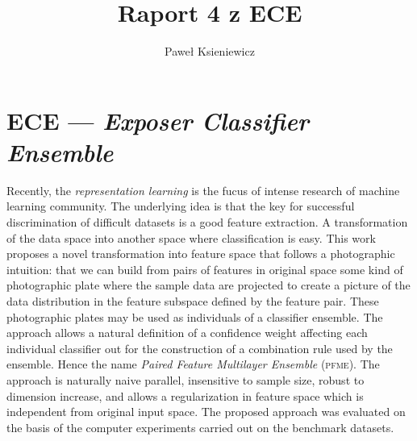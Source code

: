 \documentclass[]{article}
\title{Raport 4 z ECE}
\author{Paweł Ksieniewicz}
\begin{document}
\newenvironment{ride}[2]
{
	\caption{#2}
    \label{tab:results}
	\centering
	\begin{tabular}{lS>{\color{red}}S}
		\\\toprule{promień} & {accuracy} & {\textsc{bac}} \\\midrule
	    \csvreader[head to column names]{#1}{}%
	    {\radius & \accuracy & \bac\\}%
	\end{tabular}
	
	\begin{tikzpicture}
	\begin{axis}[
	    grid=both,
	    grid style={line width=.1pt, draw=gray!10},
	    major grid style={line width=.2pt,draw=gray!50},
	    width=6cm,
	    height=3cm,
	    xmin=0.01, xmax=0.29,
	    ymin=.55, ymax=1,
	    ytick = {.5, .6, .7, .8, .9, 1},
	    yticklabels = { ~, 60\%, ~, 80\%, ~, 100\%},
	    xtick = {0, .05, .1, 0.15, 0.2, 0.25},
		xticklabels = {~, 5,10,15,20,25},
		minor tick num=2,
		ticklabel style={font=\tiny,fill=white}		]
		\addplot[color=black] table [x=radius, y=accuracy, col sep=comma] {#1};
		\addplot[color=red] table [x=radius, y=bac, col sep=comma] {#1};
	\end{axis}
	\end{tikzpicture}
}{}

\maketitle
\newpage

\section{ECE --- \emph{Exposer Classifier Ensemble}}

Recently, the \emph{representation learning} is the fucus of intense research of machine learning community. The underlying idea is that the key for successful discrimination of difficult datasets is a good feature extraction. A transformation of the data space into another space where classification is easy. This work  proposes a novel transformation into feature space that follows a photographic intuition: that we can build from pairs of features in original space some kind of photographic plate where the sample data are projected to create a picture of the data distribution in the feature subspace defined by the feature pair. These photographic plates may be used as individuals of a classifier ensemble. The approach allows a natural definition of a confidence weight affecting each individual classifier out for the construction of a combination rule used by the ensemble. Hence the name \emph{Paired Feature Multilayer Ensemble} (\textsc{pfme}).  The approach is naturally naive parallel, insensitive to sample size, robust to dimension increase, and allows a regularization in feature space which is independent from original input space. The proposed approach was evaluated on the basis of the computer experiments carried out on the benchmark datasets.
\end{document}
